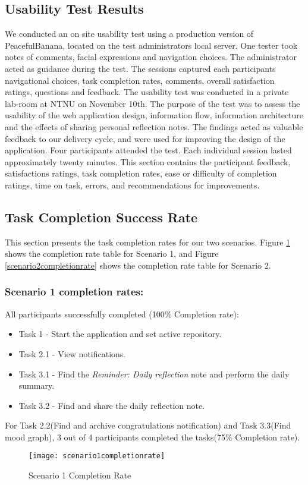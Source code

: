 \newpage
\subsection{Usability Test Results}
We conducted an on site usability test using a production version of PeacefulBanana, located on the test administrators local server. One tester took notes of comments, facial expressions and navigation choices. The administrator acted as guidance during the test. The sessions captured each participants navigational choices, task completion rates, comments, overall satisfaction ratings, questions and feedback.
The usability test was conducted in a private lab-room at NTNU on November 10th. The purpose of the test was to assess the usability of the web application design, information flow, information architecture and the effects of sharing personal reflection notes. The findings acted as valuable feedback to our delivery cycle, and were used for improving the design of the application. 
Four participants attended the test. Each individual session lasted approximately twenty minutes.
This section contains the participant feedback, satisfactions ratings, task completion rates, ease or difficulty of completion ratings, time on task, errors, and recommendations for improvements.
\subsection*{Task Completion Success Rate}
This section presents the task completion rates for our two scenarios. Figure \ref{scenario1completionrate} shows the completion rate table for Scenario 1, and Figure \ref{scenario2completionrate} shows the completion rate table for Scenario 2. 
\subsubsection{Scenario 1 completion rates:}
All participants successfully completed (100\% Completion rate):
\begin{itemize}
	\item Task 1 - Start the application and set active repository. 
	\item Task 2.1 - View notifications. 
	\item Task 3.1 - Find the \emph{Reminder: Daily reflection} note and perform the daily summary. 
	\item Task 3.2 - Find and share the daily reflection note.
\end{itemize}
For Task 2.2(Find and archive congratulations notification) and Task 3.3(Find mood graph), 3 out of 4 participants completed the tasks(75\% Completion rate). 
\begin{figure}[h!]
    \centering
        \texttt{[image: scenario1completionrate]}
    \caption{Scenario 1 Completion Rate}
    \label{scenario1completionrate}
\end{figure}

